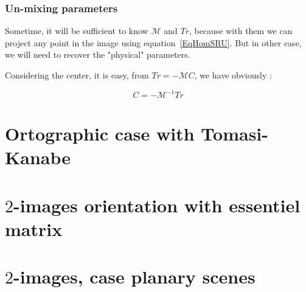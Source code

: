 \subsubsection{Un-mixing parameters}

Sometime, it will be sufficient to know $\mathcal{M}$ and $Tr$, because
with them we can project any point in the image using equation~\ref{EqHomSRU}.
But in other case, we will need to recover the "physical" parameters.

Considering the center, it is easy, from $Tr = -\mathcal{M} C$, we have
obviously :

\begin{equation}
     C= - \mathcal{M}^{-1} Tr
\end{equation}







\section{Ortographic case with Tomasi-Kanabe}


\section{$2$-images orientation with essentiel matrix}


\section{$2$-images, case planary scenes}



